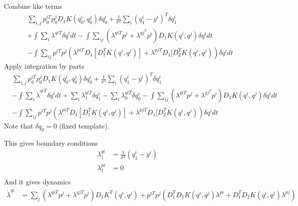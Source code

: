 \documentclass{article}
\begin{document}
Combine like terms
\begin{align*}
&\sum_{i,j}p_0^{iT}p_0^{j}D_1 K(q^i_0,q^j_0)\delta q^i_0 + \frac{1}{\sigma^2}\sum_i (q_1^i - y^i)^T \delta q^i_1\\
&+ \int \sum_i \lambda^{qiT} \delta \dot q^i dt - \int \sum_{ij} (\lambda^{qiT}p^j + \lambda^{qj^T}p^i) D_1K(q^i,q^j)\delta q^i dt  \\
& - \int \sum_{ij} p^{iT}p^j ( \lambda^{piT}  D_1[D_1^T K(q^i,q^j)] + \lambda^{pjT}  D_1[D_2^T K(q^i,q^j) )\delta q^i dt 
\end{align*}
Apply integration by parts
\begin{align*}
&\sum_{i,j}p_0^{iT}p_0^{j}D_1 K(q^i_0,q^j_0)\delta q^i_0 + \frac{1}{\sigma^2}\sum_i (q_1^i - y^i)^T \delta q^i_1\\
&- \int \sum_i \dot \lambda^{qiT} \delta  q^i dt + \sum_i \lambda^{qiT}_1\delta q^i_1  - \sum_i \lambda^{qiT}_0\delta q^i_0 - \int \sum_{ij} (\lambda^{qiT}p^j + \lambda^{qj^T}p^i) D_1K(q^i,q^j)\delta q^i dt  \\
& - \int \sum_{ij} p^{iT}p^j ( \lambda^{piT}  D_1[D_1^T K(q^i,q^j)] + \lambda^{pjT}  D_1[D_2^T K(q^i,q^j) )\delta q^i dt 
\end{align*}
Note that $\delta q_0 = 0$ (fixed template).

This gives boundary conditions
\begin{align*}
\lambda_1^{qi} &= \frac{1}{\sigma^2}(q_1^i - y^i) \\
\lambda_1^{pi} &= 0\\
\end{align*}
And it gives dynamics
\begin{align*}
\dot \lambda^{qi} &= \sum_j (\lambda^{qiT}p^j + \lambda^{qjT}p^i)D_1 K^T(q^i,q^j) + p^{iT}p^j(D_1^TD_1K(q^i,q^j)\lambda^{pi} + D_1^TD_2 K(q^i,q^j)\lambda^{pj})
\end{align*}
\end{document}
